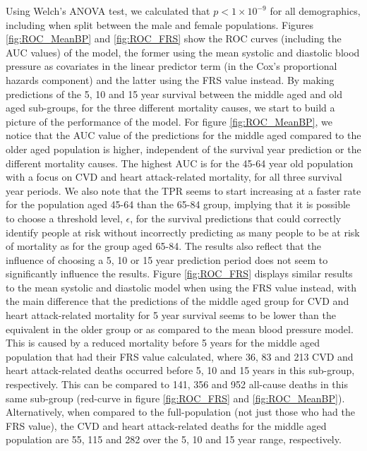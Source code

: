 \documentclass[
]{article}
\begin{document}
Using Welch's ANOVA test, we calculated that \(p<1\times 10^{-9}\) for all demographics, including when split between the male and female populations. Figures \ref{fig:ROC_MeanBP} and \ref{fig:ROC_FRS} show the ROC curves (including the AUC values) of the model, the former using the mean systolic and diastolic blood pressure as covariates in the linear predictor term (in the Cox's proportional hazards component) and the latter using the FRS value instead. By making predictions of the 5, 10 and 15 year survival between the middle aged and old aged sub-groups, for the three different mortality causes, we start to build a picture of the performance of the model. For figure \ref{fig:ROC_MeanBP}, we notice that the AUC value of the predictions for the middle aged compared to the older aged population is higher, independent of the survival year prediction or the different mortality causes. The highest AUC is for the 45-64 year old population with a focus on CVD and heart attack-related mortality, for all three survival year periods. We also note that the TPR seems to start increasing at a faster rate for the population aged 45-64 than the 65-84 group, implying that it is possible to choose a threshold level, \(\epsilon\), for the survival predictions that could correctly identify people at risk without incorrectly predicting as many people to be at risk of mortality as for the group aged 65-84. The results also reflect that the influence of choosing a 5, 10 or 15 year prediction period does not seem to significantly influence the results. Figure \ref{fig:ROC_FRS} displays similar results to the mean systolic and diastolic model when using the FRS value instead, with the main difference that the predictions of the middle aged group for CVD and heart attack-related mortality for 5 year survival seems to be lower than the equivalent in the older group or as compared to the mean blood pressure model. This is caused by a reduced mortality before 5 years for the middle aged population that had their FRS value calculated, where 36, 83 and 213 CVD and heart attack-related deaths occurred before 5, 10 and 15 years in this sub-group, respectively. This can be compared to 141, 356 and 952 all-cause deaths in this same sub-group (red-curve in figure \ref{fig:ROC_FRS} and \ref{fig:ROC_MeanBP}). Alternatively, when compared to the full-population (not just those who had the FRS value), the CVD and heart attack-related deaths for the middle aged population are 55, 115 and 282 over the 5, 10 and 15 year range, respectively.
\end{document}
